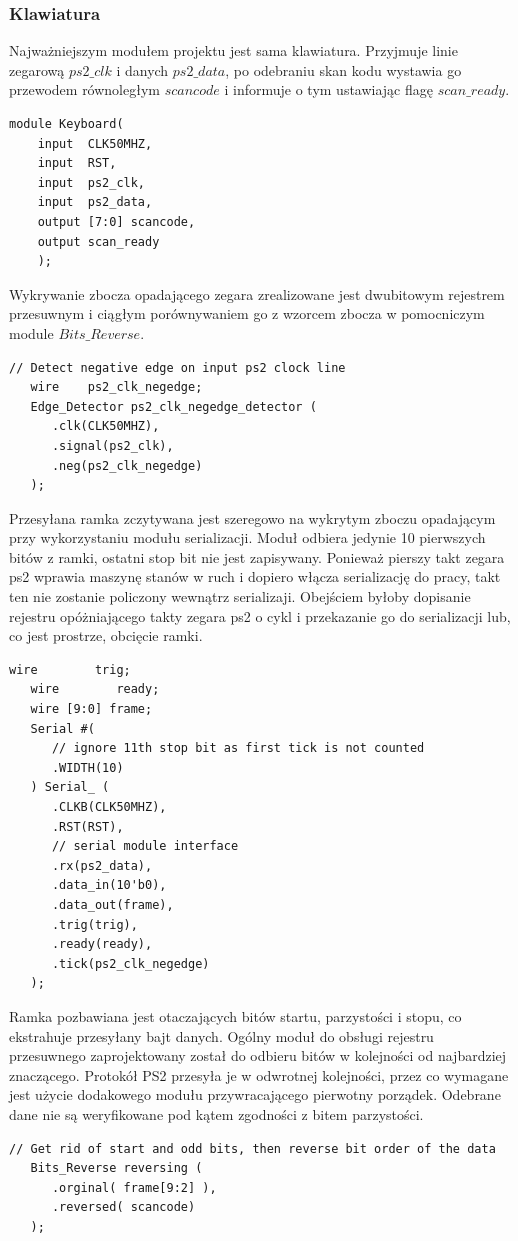 \documentclass[a4paper,12pt]{article}
\begin{document}
\subsubsection{Klawiatura}
Najważniejszym modułem projektu jest sama klawiatura. Przyjmuje linie zegarową $ps2\_clk$ i danych $ps2\_data$, po odebraniu skan kodu wystawia go przewodem równoległym $scancode$ i informuje o tym ustawiając flagę $scan\_ready$.
\begin{lstlisting}[label=Keyboard,caption=Keyboard.v]
module Keyboard(
    input  CLK50MHZ,
    input  RST,
    input  ps2_clk,
    input  ps2_data,
    output [7:0] scancode,
    output scan_ready
    );
\end{lstlisting}

Wykrywanie zbocza opadającego zegara zrealizowane jest dwubitowym rejestrem przesuwnym i ciągłym porównywaniem go z wzorcem zbocza w pomocniczym module $Bits\_Reverse$.
\begin{lstlisting}[label=Keyboard,caption=Keyboard.v,firstnumber=10]
   // Detect negative edge on input ps2 clock line
   wire    ps2_clk_negedge;
   Edge_Detector ps2_clk_negedge_detector (
      .clk(CLK50MHZ),
      .signal(ps2_clk),
      .neg(ps2_clk_negedge)
   );
\end{lstlisting}

Przesyłana ramka zczytywana jest szeregowo na wykrytym zboczu opadającym przy wykorzystaniu modułu serializacji. Moduł odbiera jedynie 10 pierwszych bitów z ramki, ostatni stop bit nie jest zapisywany. Ponieważ pierszy takt zegara ps2 wprawia maszynę stanów w ruch i dopiero włącza serializację do pracy, takt ten nie zostanie policzony wewnątrz serializaji. Obejściem byłoby dopisanie rejestru opóżniającego takty zegara ps2 o cykl i przekazanie go do serializacji lub, co jest prostrze, obcięcie ramki.
\begin{lstlisting}[label=Keyboard,caption=Keyboard.v,firstnumber=18]
   wire        trig;
   wire        ready;
   wire [9:0] frame;
   Serial #(
      // ignore 11th stop bit as first tick is not counted
      .WIDTH(10)
   ) Serial_ (
      .CLKB(CLK50MHZ),
      .RST(RST),
      // serial module interface
      .rx(ps2_data),
      .data_in(10'b0),
      .data_out(frame),
      .trig(trig),
      .ready(ready),
      .tick(ps2_clk_negedge)
   );
\end{lstlisting}

Ramka pozbawiana jest otaczających bitów startu, parzystości i stopu, co ekstrahuje przesyłany bajt danych. Ogólny moduł do obsługi rejestru przesuwnego zaprojektowany został do odbieru bitów w kolejności od najbardziej znaczącego. Protokół PS2 przesyła je w odwrotnej kolejności, przez co wymagane jest użycie dodakowego modułu przywracającego pierwotny porządek. Odebrane dane nie są weryfikowane pod kątem zgodności z bitem parzystości.
\begin{lstlisting}[label=Keyboard,caption=Keyboard.v,firstnumber=36]
   // Get rid of start and odd bits, then reverse bit order of the data
   Bits_Reverse reversing (
      .orginal( frame[9:2] ),
      .reversed( scancode)
   );
\end{lstlisting}
\end{document}
